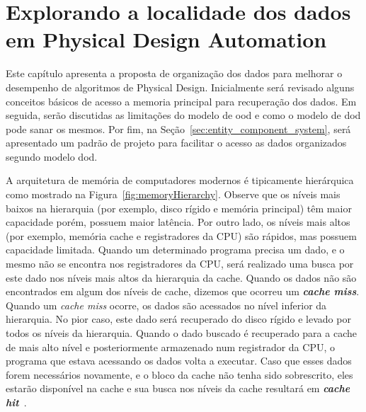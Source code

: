 \acresetall{}
\chapter{Explorando a localidade dos dados em Physical Design Automation}
\label{cap:tecnica_proposta}

Este capítulo apresenta a proposta de organização dos dados para melhorar o desempenho de algoritmos de Physical Design.
Inicialmente será revisado alguns conceitos básicos de acesso a memoria principal para recuperação dos dados.
Em seguida, serão discutidas as limitações do modelo de \ac{ood} e como o modelo de \ac{dod} pode sanar os mesmos.
Por fim, na Seção~\ref{sec:entity_component_system}, será apresentado um padrão de projeto para facilitar o acesso as dados organizados segundo modelo \ac{dod}.

A arquitetura de memória de computadores modernos é tipicamente hierárquica como mostrado na Figura~\ref{fig:memoryHierarchy}. Observe que os níveis mais baixos na hierarquia (por exemplo, disco rígido e memória principal) têm maior capacidade porém, possuem maior latência. Por outro lado, os níveis mais altos (por exemplo, memória cache e registradores da CPU) são rápidos, mas possuem capacidade limitada. Quando um determinado programa precisa um dado, e o mesmo não se encontra nos registradores da CPU, será realizado uma busca por este dado nos níveis mais altos da hierarquia da  cache. Quando os dados não são encontrados em algum dos níveis de cache, dizemos que ocorreu um \textbf{\textit{cache miss}}. Quando um \textit{cache miss} ocorre, os dados são acessados no nível inferior da hierarquia. No pior caso, este dado será recuperado do disco rígido e levado por todos os níveis da hierarquia. Quando o dado buscado é recuperado para a cache de mais alto nível e posteriormente armazenado num registrador da CPU, o programa que estava acessando os dados volta a executar. Caso que esses dados forem necessários novamente, e o bloco da cache não tenha sido sobrescrito, eles estarão disponível na cache e sua busca nos níveis da cache resultará em \textbf{\textit{cache hit}}~\cite{patterson2013computer}.

